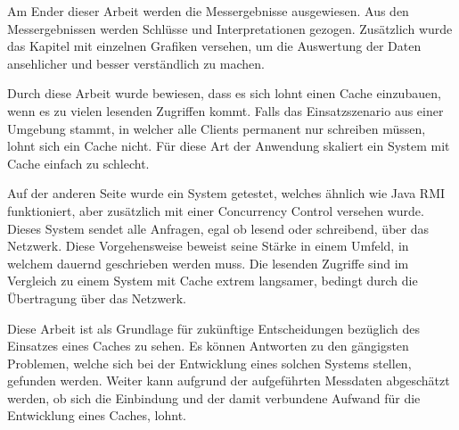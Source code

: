 Am Ender dieser Arbeit werden die Messergebnisse ausgewiesen. Aus den Messergebnissen werden Schlüsse und Interpretationen gezogen. Zusätzlich wurde das Kapitel mit einzelnen Grafiken versehen, um die Auswertung der Daten ansehlicher und besser verständlich zu machen.

Durch diese Arbeit wurde bewiesen, dass es sich lohnt einen Cache einzubauen, wenn es zu vielen lesenden Zugriffen kommt. Falls das Einsatzszenario aus einer Umgebung stammt, in welcher alle Clients permanent nur schreiben müssen, lohnt sich ein Cache nicht. Für diese Art der Anwendung skaliert ein System mit Cache einfach zu schlecht. 

Auf der anderen Seite wurde ein System getestet, welches ähnlich wie Java RMI funktioniert, aber zusätzlich mit einer Concurrency Control versehen wurde. Dieses System sendet alle Anfragen, egal ob lesend oder schreibend, über das Netzwerk. Diese Vorgehensweise beweist seine Stärke in einem Umfeld, in welchem dauernd geschrieben werden muss. Die lesenden Zugriffe sind im Vergleich zu einem System mit Cache extrem langsamer, bedingt durch die Übertragung über das Netzwerk.

Diese Arbeit ist als Grundlage für zukünftige Entscheidungen bezüglich des Einsatzes eines Caches zu sehen. Es können Antworten zu den gängigsten Problemen, welche sich bei der Entwicklung eines solchen Systems stellen, gefunden werden. Weiter kann aufgrund der aufgeführten Messdaten abgeschätzt werden, ob sich die Einbindung und der damit verbundene Aufwand für die Entwicklung eines Caches, lohnt.
